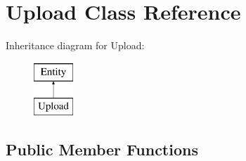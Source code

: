 \hypertarget{classUpload}{
\section{Upload Class Reference}
\label{classUpload}
}
Inheritance diagram for Upload:\begin{figure}[H]
\begin{center}
\leavevmode
\includegraphics[height=2.000000cm]{classUpload}
\end{center}
\end{figure}
\subsection*{Public Member Functions}
